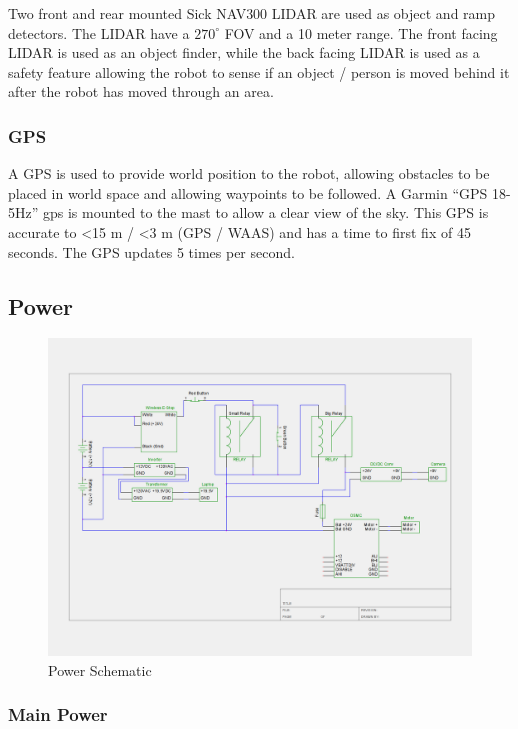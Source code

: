 Two front and rear mounted Sick NAV300 LIDAR are used as object and ramp detectors. The LIDAR have a $270^{\circ}$ FOV and a 10 meter range. The front facing LIDAR is used as an object finder, while the back facing LIDAR is used as a safety feature allowing the robot to sense if an object / person is moved behind it after the robot has moved through an area.

\subsubsection{GPS}

A GPS is used to provide world position to the robot, allowing obstacles to be placed in world space and allowing waypoints to be followed. A Garmin ``GPS 18-5Hz'' gps is mounted to the mast to allow a clear view of the sky. This GPS is accurate to <15 m / <3 m (GPS / WAAS) and has a time to first fix of 45 seconds. The GPS updates 5 times per second.

\subsection{Power}

\begin{figure}[H]
\begin{center}
\includegraphics[width=6in]{./igvc_power.png}
\caption{Power Schematic}
\label{FIG:Power}
\end{center}
\end{figure}

\subsubsection{Main Power}

